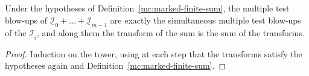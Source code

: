 \begin{lemma}
\label{mc:marked-finite-sum-tower}
\leanok
Under the hypotheses of Definition~\ref{mc:marked-finite-sum}, the multiple test blow-ups of \(\underline{\mathcal I}_0+\dots+\underline{\mathcal I}_{m-1}\) are exactly
the simultaneous multiple test blow-ups of the \(\underline{\mathcal I}_i\), and along them the transform of the sum is the sum of the transforms.
\end{lemma}
\begin{proof}
\leanok
Induction on the tower, using at each step that the transforms satisfy the hypotheses again and Definition~\ref{mc:marked-finite-sum}.
\end{proof}
